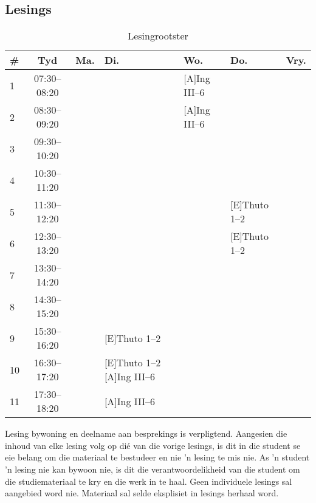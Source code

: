    \subsection{Lesings}
        \begin{table}[!h]
            \begin{center}
             \begin{tabular}{|l|c|p{1.5cm}|p{2.4cm}|p{2.2cm}|p{2.4cm}|p{1.5cm}|}
                 \hline
                 {\bf \#} & {\bf Tyd} & {\bf Ma.} & {\bf Di.} & {\bf Wo.} &
                 {\bf Do.} & {\bf Vry.} \\
                 \hline
                 1  & 07:30--08:20 &  &  & [A]Ing III--6 &  & \\ \hline
                 2  & 08:30--09:20 &  &  & [A]Ing III--6 &  & \\ \hline
                 3  & 09:30--10:20 &  &  &  &  & \\ \hline
                 4  & 10:30--11:20 &  &  &  &  & \\ \hline
                 5  & 11:30--12:20 &  &  &  & [E]Thuto 1--2 & \\ \hline
                 6  & 12:30--13:20 &  &  &  & [E]Thuto 1--2 & \\ \hline
                 7  & 13:30--14:20 &  &  &  &  & \\ \hline
                 8  & 14:30--15:20 &  &  &  &  & \\ \hline
                 9  & 15:30--16:20 &  & [E]Thuto 1--2 &  &  & \\ \hline
                 10 & 16:30--17:20 &  & [E]Thuto 1--2 [A]Ing III--6 &  &  & \\ \hline
                 11 & 17:30--18:20 &  & [A]Ing III--6 &  &  & \\
                 \hline
             \end{tabular}
             \caption{Lesingrootster}
            \label{tab:lectures}
            \end{center}
        \end{table}
        
	Lesing bywoning en deelname aan besprekings is verpligtend.
        Aangesien die inhoud van elke lesing volg op di\'{e} van die
        vorige lesings, is dit in die student se eie belang om die
        materiaal te bestudeer en nie 'n lesing te mis nie. As 'n
        student 'n lesing nie kan bywoon nie, is dit die
        verantwoordelikheid van die student om die studiemateriaal te
        kry en die werk in te haal.  Geen individuele lesings sal
        aangebied word nie. Materiaal sal selde eksplisiet in lesings
        herhaal word.
        
